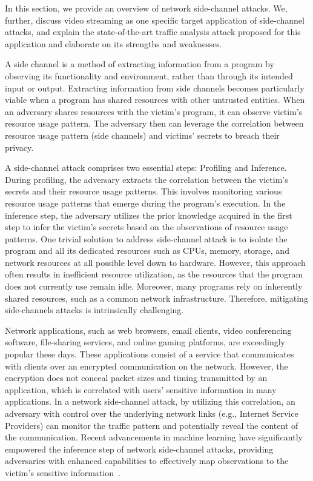 In this section, we provide an overview of network side-channel attacks. 
We, further, discuss video streaming as one specific target application of side-channel attacks, and explain the state-of-the-art traffic analysis attack proposed for this application and elaborate on its strengths and weaknesses. 

A side channel is a method of extracting information from a program by observing its functionality and environment, rather than through its intended input or output. 
Extracting information from side channels becomes particularly viable when a program has shared resources with other untrusted entities. 
When an adversary shares resources with the victim's program, it can observe victim's resource usage pattern.
The adversary then can leverage the correlation between resource usage pattern (side channels) and victims' secrets to breach their privacy.

A side-channel attack comprises two essential steps: Profiling and Inference.
During profiling, the adversary extracts the correlation between the victim's secrets and their resource usage patterns.
This involves monitoring various resource usage patterns that emerge during the program's execution.
In the inference step, the adversary utilizes the prior knowledge acquired in the first step to infer the victim's secrets based on the observations of resource usage patterns.
One trivial solution to address side-channel attack is to isolate the program and all its dedicated resources such as CPUs, memory, storage, and network resources at all possible level down to hardware. 
However, this approach often results in inefficient resource utilization, as the resources that the program does not currently use remain idle. 
Moreover, many programs rely on inherently shared resources, such as a common network infrastructure.
Therefore, mitigating side-channels attacks is intrinsically challenging. 

Network applications, such as web browsers, email clients, video conferencing software, file-sharing services, and online gaming platforms, are exceedingly popular these days.
These applications consist of a service that communicates with clients over an encrypted communication on the network.
However, the encryption does not conceal packet sizes and timing transmitted by an application, which is correlated with users' sensitive information in many applications.
In a network side-channel attack, by utilizing this correlation, an adversary with control over the underlying network links (e.g., Internet Service Providers) can monitor the traffic pattern and potentially reveal the content of the communication.
Recent advancements in machine learning have significantly empowered the inference step of network side-channel attacks, providing adversaries with enhanced capabilities to effectively map observations to the victim's sensitive information~\cite{schuster2017beautyburst, bhat2019varcnn, hayes2016kfp, sirinam2018df}.


